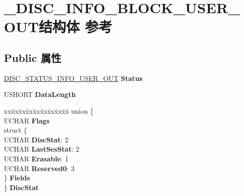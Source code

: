 \hypertarget{struct___d_i_s_c___i_n_f_o___b_l_o_c_k___u_s_e_r___o_u_t}{}\section{\+\_\+\+D\+I\+S\+C\+\_\+\+I\+N\+F\+O\+\_\+\+B\+L\+O\+C\+K\+\_\+\+U\+S\+E\+R\+\_\+\+O\+U\+T结构体 参考}
\label{struct___d_i_s_c___i_n_f_o___b_l_o_c_k___u_s_e_r___o_u_t}
\subsection*{Public 属性}
\begin{DoxyCompactItemize}
\item 
\mbox{\label{struct___d_i_s_c___i_n_f_o___b_l_o_c_k___u_s_e_r___o_u_t_a9c788545dd016df872ba32a7656f404a}} 
\hyperlink{struct___d_i_s_c___s_t_a_t_u_s___i_n_f_o___u_s_e_r___o_u_t}{D\+I\+S\+C\+\_\+\+S\+T\+A\+T\+U\+S\+\_\+\+I\+N\+F\+O\+\_\+\+U\+S\+E\+R\+\_\+\+O\+UT} {\bfseries Status}
\item 
\mbox{\label{struct___d_i_s_c___i_n_f_o___b_l_o_c_k___u_s_e_r___o_u_t_a391cc556a4bb57d16038a97c7086f8f8}} 
U\+S\+H\+O\+RT {\bfseries Data\+Length}
\item 
\mbox{\label{struct___d_i_s_c___i_n_f_o___b_l_o_c_k___u_s_e_r___o_u_t_ad7648ddccae55b80cdc521e5fac3d75c}} 
\begin{tabbing}
xx\=xx\=xx\=xx\=xx\=xx\=xx\=xx\=xx\=\kill
union \{\\
\>UCHAR {\bfseries Flags}\\
\>struct \{\\
\>\>UCHAR {\bfseries DiscStat}: 2\\
\>\>UCHAR {\bfseries LastSesStat}: 2\\
\>\>UCHAR {\bfseries Erasable}: 1\\
\>\>UCHAR {\bfseries Reserved0}: 3\\
\>\} {\bfseries Fields}\\
\} {\bfseries DiscStat}\\


\end{tabbing}
\end{DoxyCompactItemize}
